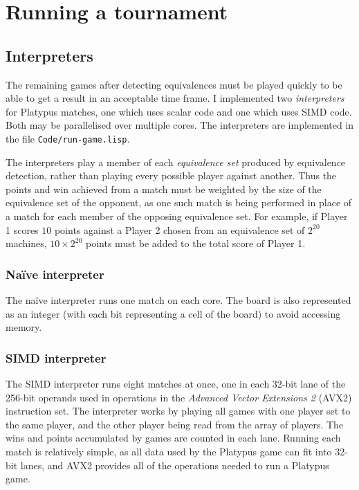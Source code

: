 
\chapter{Running a tournament}

\section{Interpreters}

The remaining games after detecting equivalences must be played
quickly to be able to get a result in an acceptable time frame.
I implemented two \emph{interpreters} for Platypus matches, one which
uses scalar code and one which uses SIMD code. Both may be parallelised
over multiple cores. The interpreters are implemented in the file
\texttt{Code/run-game.lisp}.

The interpreters play a member of each \emph{equivalence set} produced
by equivalence detection, rather than playing every possible player
against another. Thus the points and win achieved from a match must
be weighted by the size of the equivalence set of the opponent, as one
such match is being performed in place of a match for each member
of the opposing equivalence set. For example, if Player 1 scores $10$ points
against a Player 2 chosen from an equivalence set of $2^{20}$ machines,
$10 \times 2^{20}$ points must be added to the total score of Player 1.

\subsection{Naïve interpreter}

The na\"ive interpreter runs one match on each core. The board is also
represented as an integer (with each bit representing a cell of the board)
to avoid accessing memory.

\subsection{SIMD interpreter}

The SIMD interpreter runs eight matches at once, one in each 32-bit lane
of the 256-bit operands used in operations in the \emph{Advanced Vector
  Extensions 2} (AVX2) instruction set. The interpreter works by playing
all games with one player set to the same player, and the other player
being read from the array of players. The wins and points accumulated
by games are counted in each lane. Running each match is relatively
simple, as all data used by the Platypus game can fit into 32-bit lanes,
and AVX2 provides all of the operations needed to run a Platypus game.

